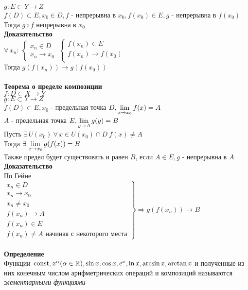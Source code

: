 \documentclass[12pt]{article}
\begin{document}
$g:E\subset Y \rightarrow Z$\\
$f(D) \subset E, x_0 \in D, f$ - непрерывна в $x_0, f(x_0) \in E, g$ - непрерывна в $f(x_0)$\\
Тогда $g\circ f$ непрерывна в $x_0$\\
\textbf{Доказательство}\\
$\forall\,x_n:\ \left\{\begin{array}{l}
     x_n \in D\\
     x_n \rightarrow x_0
\end{array}\right.\ \left\{\begin{array}{l}
     f(x_n) \in E\\
     f(x_n) \rightarrow f(x_0)\\
\end{array}\right.$\\
Тогда $g(f(x_n)) \rightarrow g(f(x_0))$\\\\
\textbf{Теорема о пределе композиции}\\
$f: D \subset X \rightarrow Y$\\
$g: E\subset Y \rightarrow Z$\\
$f(D) \subset E, x_0$ - предельная точка $D, \lim\limits_{x\rightarrow x_0} f(x) = A$\\
$A$ - предельная точка $E, \lim\limits_{y\rightarrow A} g(y) = B$\\
Пусть $\exists\,U(x_0)\ \forall\, x\in U(x_0) \cap D\ f(x) \neq A$\\
Тогда $\exists\,\lim\limits_{x\rightarrow x_0} g(f(x)) = B$\\
Также предел будет существовать и равен $B$, если $A\in E, g$ - непрерывна в $A$\\
\textbf{Доказательство}\\
По Гейне\\
$\left.\begin{array}{l}
     x_n \in D\\
     x_n \rightarrow x_0\\
     x_n \neq x_0\\
     f(x_n) \rightarrow A\\
     f(x_n) \in E\\
     f(x_n) \neq A \text{ начиная с некоторого места}
\end{array}\right\} \Rightarrow g(f(x_n)) \rightarrow B$\\\\
\textbf{Определение}\\
Функции $\operatorname{const}, x^\alpha (\alpha \in \mathbb{R}), \sin x, \cos x, e^x, \ln x, \arcsin x, \arctan x$ и полученные из них конечным числом арифметрических операций и композиций называются \textit{элементарными функциями}\\
\end{document}
